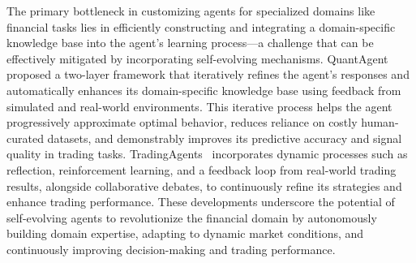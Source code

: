 The primary bottleneck in customizing agents for specialized domains like financial tasks lies in efficiently constructing and integrating a domain-specific knowledge base into the agent’s learning process—a challenge that can be effectively mitigated by incorporating self-evolving mechanisms. 
QuantAgent~\citep{wang2024quantagent} proposed a two-layer framework that iteratively refines the agent's responses and automatically enhances its domain-specific knowledge base using feedback from simulated and real-world environments. This iterative process helps the agent progressively approximate optimal behavior, reduces reliance on costly human-curated datasets, and demonstrably improves its predictive accuracy and signal quality in trading tasks. 
TradingAgents~\citep{xiao2024tradingagents} incorporates dynamic processes such as reflection, reinforcement learning, and a feedback loop from real-world trading results, alongside collaborative debates, to continuously refine its strategies and enhance trading performance. 
These developments underscore the potential of self-evolving agents to revolutionize the financial domain by autonomously building domain expertise, adapting to dynamic market conditions, and continuously improving decision-making and trading performance.

